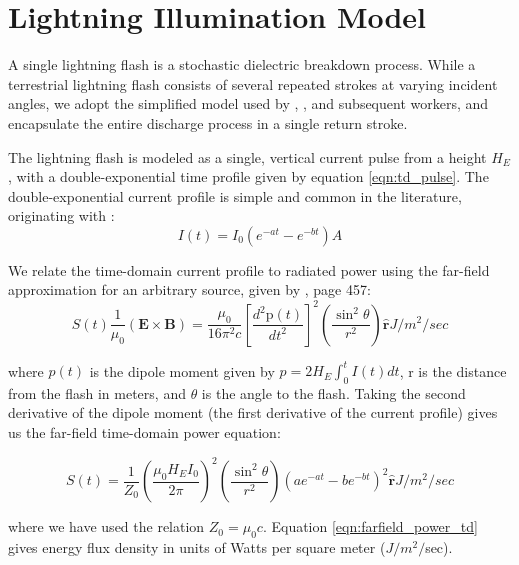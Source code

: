 \section{Lightning Illumination Model}
\label{section:input_power}
A single lightning flash is a stochastic dielectric breakdown process. While a terrestrial lightning flash consists of several repeated strokes at varying incident angles, we adopt the simplified model used by \cite{Lauben1998}, \cite{Bortnik2005}, and subsequent workers, and encapsulate the entire discharge process in a single return stroke.

The lightning flash is modeled as a single, vertical current pulse from a height $H_E$, with a double-exponential time profile given by equation \ref{eqn:td_pulse}. The double-exponential current profile is simple and common in the literature, originating with \cite{Bruce_Golde_1941}:
\begin{equation}
\label{eqn:td_pulse}
I(t)=I_0(e^{-a t} - e^{-b t}) \unit{A}
\end{equation}

We relate the time-domain current profile to radiated power using the far-field approximation for an arbitrary source, given by \cite{Griffiths1999}, page 457:
\begin{equation}
\label{eqn:griffiths_power}
S(t) 
 \frac{1}{\mu_0}(\mathbf{E} \times \mathbf{B}) = \frac{\mu_0}{16\pi^2c}\left[\frac{d^2\mathrm{p}(t)}{dt^2}\right]^2 \left(\frac{\sin^2\theta}{r^2}\right)\mathbf{\hat{r}} \unit{J/m^2/sec}
\end{equation}

where $p(t)$ is the dipole moment given by $p=2 H_E \int_0^t{I(t)}dt$, r is the distance from the flash in meters, and $\theta$ is the angle to the flash. Taking the second derivative of the dipole moment (the first derivative of the current profile) gives us the far-field time-domain power equation:

\begin{equation}
\label{eqn:farfield_power_td}
S(t) = \frac{1}{Z_0}\left(\frac{\mu_0 H_E I_0}{2 \pi}\right)^2\left(\frac{\sin^2\theta}{r^2}\right) \left(a e^{-a t} - b e^{-b t}\right)^2  \mathbf{\hat{r}}
\unit{J/m^2/sec}
\end{equation}

where we have used the relation $Z_0 = \mu_0 c$. Equation \ref{eqn:farfield_power_td} gives energy flux density in units of Watts per square meter ($J/m^2/$sec).

